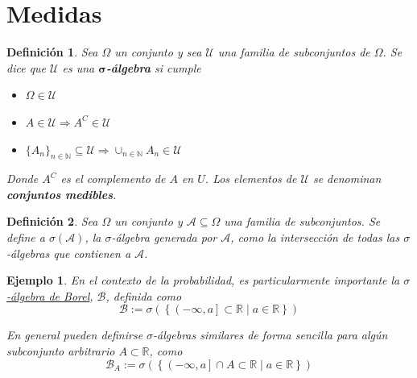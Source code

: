 \documentclass[12pt,letterpaper]{book}
\newtheorem{definicion}{Definición}[chapter]
\newtheorem{ejemplo}{Ejemplo}[chapter]
\newcommand{\R}{\mathbb{R}}
\newcommand{\talque}{\mathrel{}\middle|\mathrel{}}
\begin{document}

\section{Medidas}

\begin{definicion}%
Sea $\Omega$ un conjunto y sea $\mathcal{U}$ una familia de subconjuntos de $\Omega$. Se dice que $\mathcal{U}$ es una \textbf{$\boldsymbol{\sigma}$-álgebra} si cumple
\begin{itemize}
\item $\Omega \in \mathcal{U}$
\item $A \in \mathcal{U} \Rightarrow A^{C} \in \mathcal{U}$
\item 
$ \displaystyle \{ A_n \}_{n\in \mathbb{N}} \subseteq \mathcal{U} 
\Rightarrow \cup_{n\in \mathbb{N}} A_n \in \mathcal{U}$
\end{itemize}
Donde $A^{C}$ es el complemento de $A$ en $U$. Los elementos de $\mathcal{U}$ se denominan \textbf{conjuntos medibles}. 
\end{definicion}

\begin{definicion}
Sea $\Omega$ un conjunto y $\mathcal{A} \subseteq \Omega$ una familia de subconjuntos. Se define a $\sigma(\mathcal{A})$, la $\sigma$-álgebra generada por $\mathcal{A}$, como la intersección de todas las $\sigma$-álgebras que contienen a $\mathcal{A}$.
\end{definicion}

\begin{ejemplo}
En el contexto de la probabilidad, es particularmente importante la \underline{$\sigma$-álgebra de Borel}, $\mathcal{B}$, definida como
\begin{equation}
\mathcal{B} := \sigma\left( \left\{ \left( -\infty , a \right] \subset \R \talque a\in \R \right\} \right)
\end{equation}

En general pueden definirse $\sigma$-álgebras similares de forma sencilla para algún subconjunto arbitrario $A \subset \R$, como
\begin{equation}
\mathcal{B}_A := \sigma\left( \left\{ \left( -\infty , a \right] \cap A \subset \R \talque a\in \R \right\} \right)
\end{equation}
\end{ejemplo}
\end{document}
